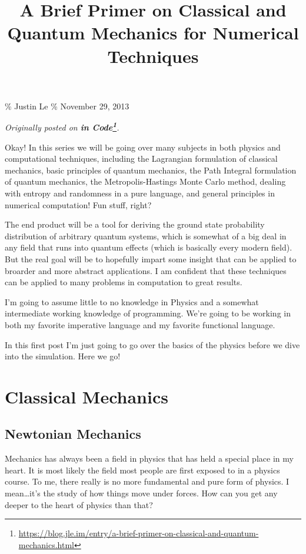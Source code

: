 \documentclass[]{article}
\title{A Brief Primer on Classical and Quantum Mechanics for Numerical
Techniques}
\renewcommand{\href}[2]{#2\footnote{\url{#1}}}
\begin{document}
\maketitle

\% Justin Le \% November 29, 2013

\emph{Originally posted on
\textbf{\href{https://blog.jle.im/entry/a-brief-primer-on-classical-and-quantum-mechanics.html}{in
Code}}.}

Okay! In this series we will be going over many subjects in both physics and
computational techniques, including the Lagrangian formulation of classical
mechanics, basic principles of quantum mechanics, the Path Integral formulation
of quantum mechanics, the Metropolis-Hastings Monte Carlo method, dealing with
entropy and randomness in a pure language, and general principles in numerical
computation! Fun stuff, right?

The end product will be a tool for deriving the ground state probability
distribution of arbitrary quantum systems, which is somewhat of a big deal in
any field that runs into quantum effects (which is basically every modern
field). But the real goal will be to hopefully impart some insight that can be
applied to broarder and more abstract applications. I am confident that these
techniques can be applied to many problems in computation to great results.

I'm going to assume little to no knowledge in Physics and a somewhat
intermediate working knowledge of programming. We're going to be working in both
my favorite imperative language and my favorite functional language.

In this first post I'm just going to go over the basics of the physics before we
dive into the simulation. Here we go!

\section{Classical Mechanics}\label{classical-mechanics}

\subsection{Newtonian Mechanics}\label{newtonian-mechanics}

Mechanics has always been a field in physics that has held a special place in my
heart. It is most likely the field most people are first exposed to in a physics
course. To me, there really is no more fundamental and pure form of physics. I
mean\ldots it's the study of how things move under forces. How can you get any
deeper to the heart of physics than that?
\end{document}
